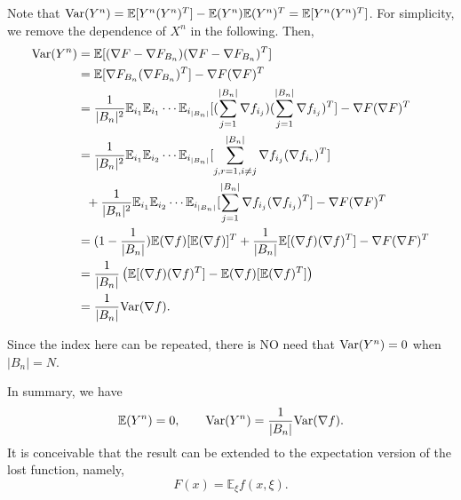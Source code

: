 Note that ${\rm Var}(Y^n) = \mathbb{E}[Y^n (Y^n)^T] - \mathbb{E}(Y^n)
\mathbb{E}(Y^n)^T = \mathbb{E}[Y^n (Y^n)^T]$. For simplicity,
we remove the dependence of $X^n$ in the following. Then, 
$$ 
\begin{aligned}
{\rm Var}(Y^n) &= \mathbb{E}[ (\nabla F - \nabla F_{B_n})
(\nabla F - \nabla F_{B_n})^T ]
\\
&= \mathbb{E}[\nabla F_{B_n} (\nabla F_{B_n})^T ] - \nabla F (\nabla
F)^T \\
&= \frac{1}{|B_n|^2} \mathbb{E}_{i_1} \mathbb{E}_{i_1} \cdots
\mathbb{E}_{i_{|B_n|}}[ (\sum_{j=1}^{|B_n|} \nabla f_{i_j})
(\sum_{j=1}^{|B_n|} \nabla f_{i_j})^T ] - \nabla F (\nabla F)^T \\
&= \frac{1}{|B_n|^2} \mathbb{E}_{i_1} \mathbb{E}_{i_2} \cdots
\mathbb{E}_{i_{|B_n|}}[ \sum_{j,r=1 , i\neq j}^{|B_n|} \nabla f_{i_j}
(\nabla f_{i_r})^T] \\ 
& ~~ + \frac{1}{|B_n|^2} \mathbb{E}_{i_1} \mathbb{E}_{i_2} \cdots
\mathbb{E}_{i_{|B_n|}} [\sum_{j=1}^{|B_n|} \nabla
f_{i_j} (\nabla f_{i_j})^T]- \nabla F (\nabla F)^T \\ 
& = (1 - \frac{1}{|B_n|}) \mathbb{E}(\nabla f) [\mathbb{E}(\nabla
f)]^T + \frac{1}{|B_n|} \mathbb{E}[ (\nabla f) (\nabla f)^T] -
\nabla F (\nabla F)^T \\
&= \frac{1}{|B_n|} \left( \mathbb{E}[(\nabla f) (\nabla f)^T] -
\mathbb{E}(\nabla f) [\mathbb{E}(\nabla f)^T] 
\right) \\
&= \frac{1}{|B_n|} {\rm Var}(\nabla f).
\end{aligned}
$$ 

\begin{remark}
	Since the index here can be repeated, there is NO need that ${\rm
		Var}(Y^n) = 0$ when $|B_n| = N$.
\end{remark}

In summary, we have 
\begin{equation} \label{equ:summary}
\mathbb{E}(Y^n) = 0, \qquad {\rm Var}(Y^n) = \frac{1}{|B_n|} {\rm
	Var}(\nabla f).
\end{equation}
It is conceivable that the result can be extended to the expectation
version of the lost function, namely, 
$$ 
F(x) = \mathbb{E}_{\xi} f(x, \xi).
$$ 


